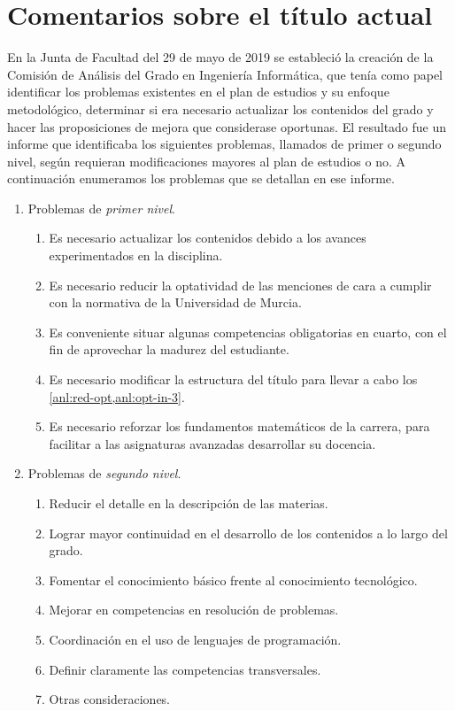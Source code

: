 \chapter{Comentarios sobre el título actual}\label{chap:analysis}


En la Junta de Facultad del 29 de mayo de 2019
se estableció la creación de
la Comisión de Análisis del Grado en Ingeniería Informática,
que tenía como papel
identificar los problemas existentes en
el plan de estudios y su enfoque metodológico,
determinar si era necesario actualizar los contenidos del grado y
hacer las proposiciones de mejora que considerase oportunas.
El resultado fue un informe que identificaba los siguientes problemas,
llamados de primer o segundo nivel,
según requieran modificaciones mayores al plan de estudios o no.
A continuación enumeramos los problemas que se detallan en ese informe.

\begin{enumerate}
    \item Problemas de \emph{primer nivel}.
    \begin{enumerate}
        \item Es necesario actualizar los contenidos
        debido a los avances experimentados en la disciplina.
        \item\label{anl:red-opt}
        Es necesario reducir la optatividad de las menciones de cara a
        cumplir con la normativa de la Universidad de Murcia.
        \item\label{anl:opt-in-3}
        Es conveniente situar algunas competencias obligatorias en cuarto,
        con el fin de aprovechar la madurez del estudiante.
        \item Es necesario modificar la estructura del título
        para llevar a cabo los \cref{anl:red-opt,anl:opt-in-3}.
        \item Es necesario reforzar los fundamentos matemáticos de la carrera,
        para facilitar a las asignaturas avanzadas desarrollar su docencia.
    \end{enumerate}

    \item Problemas de \emph{segundo nivel}.
    \begin{enumerate}
        \item Reducir el detalle en la descripción de las materias.
        \item Lograr mayor continuidad en el desarrollo de los contenidos
        a lo largo del grado.
        \item Fomentar el conocimiento básico
        frente al conocimiento tecnológico.
        \item Mejorar en competencias en resolución de problemas.
        \item Coordinación en el uso de lenguajes de programación.
        \item Definir claramente las competencias transversales.
        \item Otras consideraciones.
    \end{enumerate}
\end{enumerate}

